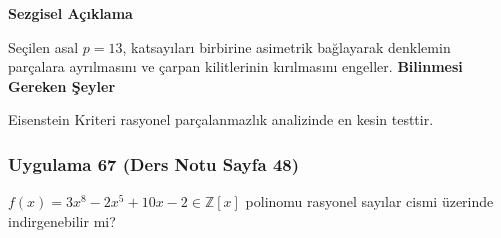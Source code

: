 \documentclass[11pt, a4paper]{article}
\newenvironment{sezgisel}{
    \vspace{0.5cm}
    \noindent\textcolor{orange!80!black}{\faLightbulb\enspace \textbf{\Large Sezgisel Açıklama}}\par\vspace{0.2cm}
    \itshape
}{}
\newenvironment{bilgi}{
    \vspace{0.5cm}
    \noindent\textcolor{red!70!black}{\faExclamationTriangle\enspace \textbf{\Large Bilinmesi Gereken Şeyler}}\par\vspace{0.2cm}
}{}
\begin{document}
\begin{sezgisel}
Seçilen asal $p=13$, katsayıları birbirine asimetrik bağlayarak denklemin parçalara ayrılmasını ve çarpan kilitlerinin kırılmasını engeller.
\end{sezgisel}
\begin{bilgi}
Eisenstein Kriteri rasyonel parçalanmazlık analizinde en kesin testtir.
\end{bilgi}

\newpage
\subsubsection{Uygulama 67 (Ders Notu Sayfa 48)}
\begin{sorubox}
$f(x) = 3x^8 - 2x^5 + 10x - 2 \in \mathbb{Z}[x]$ polinomu rasyonel sayılar cismi üzerinde indirgenebilir mi?
\end{sorubox}
\end{document}

